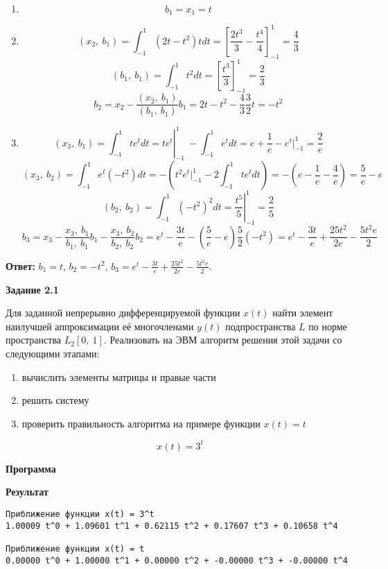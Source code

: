 \documentclass[12pt, a4paper]{article}
\begin{document}
\begin{enumerate}
\item
\[b_1 = x_1 = t\]

\item
\[(x_2,\ b_1) = \int_{-1}^1(2t - t^2)tdt = \left[ \frac{2t^3}{3} -\frac{t^4}{4}\right]_{-1}^1 =
\frac{4}{3}\]
\[(b_1,\ b_1) = \int_{-1}^1 t^2 dt = \left[ \frac{t^3}{3} \right]_{-1}^1 = \frac{2}{3} \]
\[b_2 = x_2 - \frac{(x_2,\ b_1)}{(b_1,\ b_1)}b_1 = 2t - t^2 - \frac{4}{3} 
\frac{3}{2}t = -t^2 \]

\item
\[\left.(x_3,\ b_1) = \int_{-1}^1 te^t dt = te^t \right|_{-1}^1\ - \int_{-1}^1 e^t dt = 
e + \frac{1}{e} - e^t|_{-1}^1 = \frac{2}{e}\]
\[(x_3,\ b_2) = \int_{-1}^1 e^t (-t^2)dt = - \left( t^2 e^t|_{-1}^1 - 2\int_{-1}^1te^tdt \right) =
-\left(e - \frac{1}{e} - \frac{4}{e} \right) = \frac{5}{e} - e \]
\[\left. (b_2,\ b_2) = \int_{-1}^1 (-t^2)^2 dt = \frac{t^5}{5}\right|_{-1}^1 = \frac{2}{5} \]
\[ b_3 = x_3 - \frac{x_3,\ b_1}{b_1,\ b_1}b_1 - \frac{x_3,\ b_2}{b_2,\ b_2}b_2 =
e^t - \frac{3t}{e} - \left(\frac{5}{e} - e\right) \frac{5}{2} (-t^2) = 
e^t - \frac{3t}{e} + \frac{25t^2}{2e} - \frac{5t^2e}{2} \]
\end{enumerate}

\textbf{Ответ: } $b_1 = t$, $b_2=-t^2$,
 $b_3 = e^t - \frac{3t}{e} + \frac{25t^2}{2e} - \frac{5t^2e}{2}$.

 \pagebreak

\textbf{Задание 2.1} 

Для заданной непрерывно дифференцируемой функции $x(t)$ найти элемент наилучшей
аппроксимации её многочленами $y(t)$ подпространства $L$ по норме пространства 
$L_2[0,\ 1]$. Реализовать на ЭВМ алгоритм решения этой задачи со следующими 
этапами:

\begin{enumerate}
  \item вычислить элементы матрицы и правые части
  \item решить систему
  \item проверить правильность алгоритма на примере функции $x(t) = t$
\end{enumerate}

\[x(t) = 3^t\]

\textbf{Программа}



\textbf{Результат}

\begin{verbatim}
Приближение функции x(t) = 3^t
1.00009 t^0 + 1.09601 t^1 + 0.62115 t^2 + 0.17607 t^3 + 0.10658 t^4

Приближение функции x(t) = t
0.00000 t^0 + 1.00000 t^1 + 0.00000 t^2 + -0.00000 t^3 + -0.00000 t^4
\end{verbatim}
\end{document}
